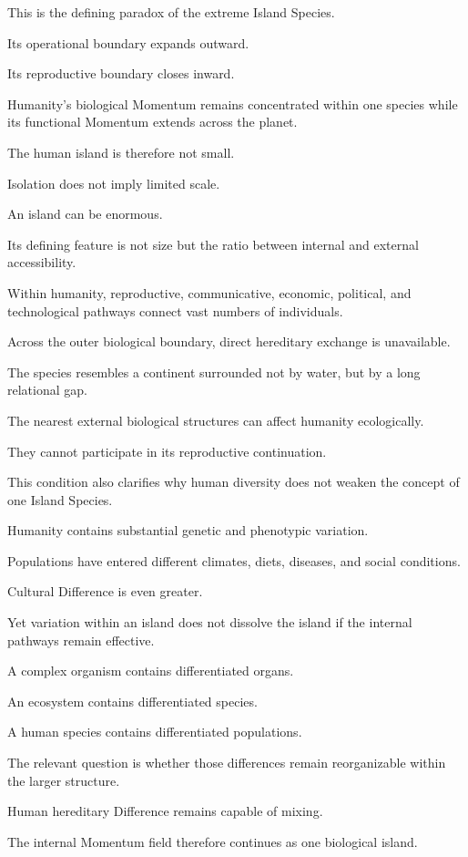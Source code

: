 This is the defining paradox of the extreme Island Species.

Its operational boundary expands outward.

Its reproductive boundary closes inward.

Humanity’s biological Momentum remains concentrated within one species while its functional Momentum extends across the planet.

The human island is therefore not small.

Isolation does not imply limited scale.

An island can be enormous.

Its defining feature is not size but the ratio between internal and external accessibility.

Within humanity, reproductive, communicative, economic, political, and technological pathways connect vast numbers of individuals.

Across the outer biological boundary, direct hereditary exchange is unavailable.

The species resembles a continent surrounded not by water, but by a long relational gap.

The nearest external biological structures can affect humanity ecologically.

They cannot participate in its reproductive continuation.

This condition also clarifies why human diversity does not weaken the concept of one Island Species.

Humanity contains substantial genetic and phenotypic variation.

Populations have entered different climates, diets, diseases, and social conditions.

Cultural Difference is even greater.

Yet variation within an island does not dissolve the island if the internal pathways remain effective.

A complex organism contains differentiated organs.

An ecosystem contains differentiated species.

A human species contains differentiated populations.

The relevant question is whether those differences remain reorganizable within the larger structure.

Human hereditary Difference remains capable of mixing.

The internal Momentum field therefore continues as one biological island.

